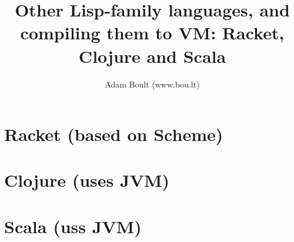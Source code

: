 \documentclass[oneside]{book}
\begin{document}
\author{Adam Boult (www.bou.lt)}
\title{Other Lisp-family languages, and compiling them to VM: Racket, Clojure and Scala}
\maketitle

\setcounter{tocdepth}{0}
\tableofcontents



\part{Racket (based on Scheme)}

\part{Clojure (uses JVM)}

\part{Scala (uss JVM)}
\end{document}
